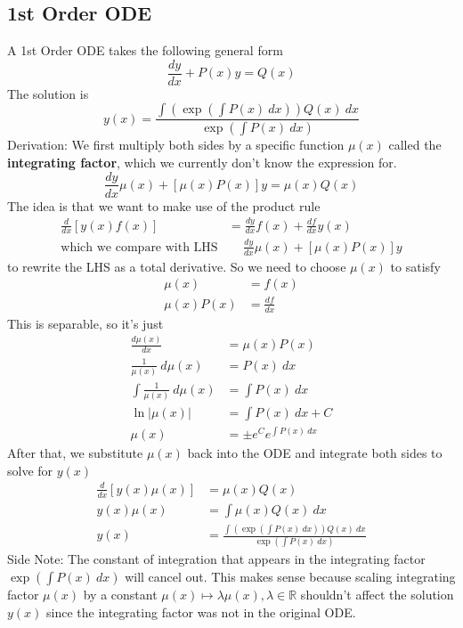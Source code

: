 \documentclass{article}
\begin{document}
\subsection{1st Order ODE}
A 1st Order ODE takes the following general form
$$\frac{dy}{dx} + P(x) y = Q(x)$$
The solution is 
$$y(x) = \frac{\int \left( \exp(\int P(x)\ dx) \right) Q(x)\ dx}{ \exp(\int P(x)\ dx)}$$
Derivation: We first multiply both sides by a specific function $\mu(x)$ called the \textbf{integrating factor}, which we currently don't know the expression for.
$$\frac{dy}{dx} \mu(x) + [\mu(x) P(x)] y = \mu(x) Q(x)$$
The idea is that we want to make use of the product rule 
\begin{align}
\frac{d}{dx} [y(x) f(x)] &= \frac{dy}{dx} f(x) + \frac{df}{dx} y(x)\\
\text{which we compare with LHS}& \quad \  \frac{dy}{dx} \mu(x) + [\mu(x)P(x)]y
\end{align}
to rewrite the LHS as a total derivative. So we need to choose $\mu(x)$ to satisfy 
\begin{align}
    \mu(x) &= f(x) \\
    \mu(x) P(x) &= \frac{df}{dx}
\end{align}
This is separable, so it's just
\begin{align}
    \frac{d\mu(x)}{dx} &= \mu(x) P(x) \\
    \frac{1}{\mu(x)}\ d\mu(x) &= P(x)\ dx \\
    \int \frac{1}{\mu(x)}\ d\mu(x) &= \int P(x)\ dx \\
    \ln |\mu(x)| &= \int P(x)\ dx + C\\
    \mu(x) &= \pm e^C e^{\int P(x) \ dx}
\end{align}
After that, we substitute $\mu(x)$ back into the ODE and integrate both sides to solve for $y(x)$
\begin{align}
    \frac{d}{dx} [y(x) \mu(x)] &= \mu(x) Q(x)\\
    y(x) \mu(x) &= \int \mu(x) Q(x)\ dx\\
    y(x) &= \frac{\int \left( \exp(\int P(x)\ dx) \right) Q(x)\ dx}{ \exp(\int P(x)\ dx)}
\end{align}
Side Note: The constant of integration that appears in the integrating factor $\exp(\int P(x)\ dx)$ will cancel out. This makes sense because scaling integrating factor $\mu(x)$ by a constant $\mu(x) \mapsto \lambda \mu(x), \lambda \in \mathbb R$ shouldn't affect the solution $y(x)$ since the integrating factor was not in the original ODE.
\end{document}
